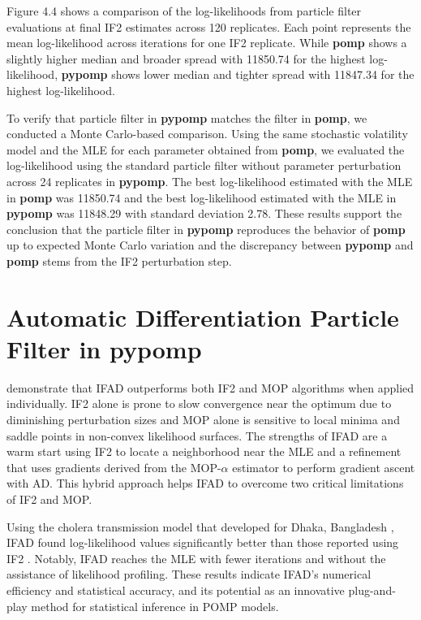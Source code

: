 \documentclass[11pt]{report}
\begin{document}
Figure 4.4 shows a comparison of the log-likelihoods from particle filter evaluations at final IF2 estimates across 120 replicates. Each point represents the mean log-likelihood across iterations for one IF2 replicate. While \textbf{pomp} shows a slightly higher median and broader spread with 11850.74 for the highest log-likelihood, \textbf{pypomp} shows lower median and tighter spread with 11847.34 for the highest log-likelihood.

To verify that particle filter in \textbf{pypomp} matches the filter in \textbf{pomp}, we conducted a Monte Carlo-based comparison. Using the same stochastic volatility model and the MLE for each parameter obtained from \textbf{pomp}, we evaluated the log-likelihood using the standard particle filter without parameter perturbation across 24 replicates in \textbf{pypomp}. The best log-likelihood estimated with the MLE in \textbf{pomp} was 11850.74 and the best log-likelihood estimated with the MLE in \textbf{pypomp} was 11848.29 with standard deviation 2.78. These results support the conclusion that the particle filter in \textbf{pypomp} reproduces the behavior of \textbf{pomp} up to expected Monte Carlo variation and the discrepancy between \textbf{pypomp} and \textbf{pomp} stems from the IF2 perturbation step. 

\newpage
\chapter{Automatic Differentiation Particle Filter in pypomp}\label{chap:adpf}
\citet{tan2024accelerated} demonstrate that IFAD outperforms both IF2 and MOP algorithms when applied individually. IF2 alone is prone to slow convergence near the optimum due to diminishing perturbation sizes and MOP alone is sensitive to local minima and saddle points in non-convex likelihood surfaces. The strengths of IFAD are a warm start using IF2 to locate a neighborhood near the MLE and a refinement that uses gradients derived from the MOP-$\alpha$ estimator to perform gradient ascent with AD. This hybrid approach helps IFAD to overcome two critical limitations of IF2 and MOP.

Using the cholera transmission model that developed for Dhaka, Bangladesh \citet{king2008inapparent}, IFAD found log-likelihood values significantly better than those reported using IF2 \citet{ionides2015inference}. Notably, IFAD reaches the MLE with fewer iterations and without the assistance of likelihood profiling. These results indicate IFAD's numerical efficiency and statistical accuracy, and its potential as an innovative plug-and-play method for statistical inference in POMP models.
\end{document}
